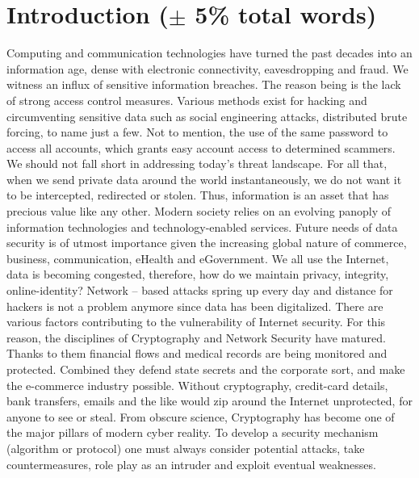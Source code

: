 \section{Introduction ($\pm$ 5\% total words)}
Computing and communication technologies have turned the past decades into an information age, dense with electronic connectivity, eavesdropping and fraud. We witness an influx of sensitive information breaches. The reason being is the lack of strong access control measures. Various methods exist for hacking and circumventing sensitive data such as social engineering attacks, distributed brute forcing, to name just a few. Not to mention, the use of the same password to access all accounts, which grants easy account access to determined scammers. We should not fall short in addressing today’s threat landscape. For all that, when we send private data around the world instantaneously, we do not want it to be intercepted, redirected or stolen. Thus, information is an asset that has precious value like any other. Modern society relies on an evolving panoply of information technologies and technology-enabled services. Future needs of data security is of utmost importance given the increasing global nature of commerce, business, communication, eHealth and eGovernment. We all use the Internet, data is becoming congested, therefore, how do we maintain privacy, integrity, online-identity? Network – based attacks spring up every day and distance for hackers is not a problem anymore since data has been digitalized. There are various factors contributing to the vulnerability of Internet security. For this reason, the disciplines of Cryptography and Network Security have matured. Thanks to them financial flows and medical records are being monitored and protected. Combined they defend state secrets and the corporate sort, and make the e-commerce industry possible. Without cryptography, credit-card details, bank transfers, emails and the like would zip around the Internet unprotected, for anyone to see or steal. From obscure science, Cryptography has become one of the major pillars of modern cyber reality. To develop a security mechanism (algorithm or protocol) one must always consider potential attacks, take countermeasures, role play as an intruder and exploit eventual weaknesses.

